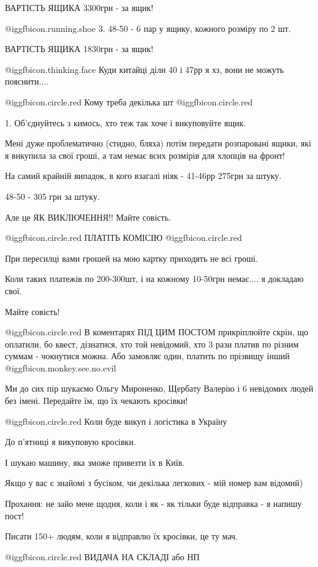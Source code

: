 ВАРТІСТЬ ЯЩИКА 3300грн - за ящик!

 @igg{fbicon.running.shoe}  3. 48-50 - 6 пар у ящику, кожного розміру по 2 шт.

ВАРТІСТЬ ЯЩИКА 1830грн - за ящик!

 @igg{fbicon.thinking.face} Куди китайці діли 40 і 47рр я хз, вони не можуть пояснити....

 @igg{fbicon.circle.red} Кому треба декілька шт @igg{fbicon.circle.red} 

1. Об'єднуйтесь з кимось, хто теж так хоче і викуповуйте ящик.

Мені дуже проблематично (стидно, бляха)  потім передати  розпаровані ящики, які
я викупила за свої гроші, а там немає всих розмірів для хлопців на фронт!

На самий крайній випадок, в кого взагалі ніяк - 41-46рр 275грн за штуку.

48-50 - 305 грн за штуку.

Але це ЯК ВИКЛЮЧЕННЯ!! Майте совість.

 @igg{fbicon.circle.red}  ПЛАТІТЬ КОМІСІЮ  @igg{fbicon.circle.red} 

При пересилці вами грошей на мою картку приходять не всі гроші.

Коли таких платежів по 200-300шт, і на кожному 10-50грн немає.... я докладаю
свої.

Майте совість!

 @igg{fbicon.circle.red}  В коментарях ПІД ЦИМ ПОСТОМ прикріплюйте скрін, що оплатили, бо квест,
дізнатися, хто той невідомий, хто 3 рази платив по різним суммам - чокнутися
можна. Або замовляє один, платить по прізвищу інший @igg{fbicon.monkey.see.no.evil} 

Ми до сих пір шукаємо Ольгу Мироненко, Щербату Валерію і 6 невідомих людей без
імені. Передайте їм, що їх чекають кросівки!

@igg{fbicon.circle.red}  Коли буде викуп і логістика в Україну

До п'ятниці я викуповую кросівки.

І шукаю машину, яка зможе привезти їх в Київ.

Якщо у вас є знайомі з бусіком, чи декілька легкових  - мій номер вам відомий)

Прохання: не зайо мене щодня, коли і як - як тільки буде відправка - я напишу
пост!

Писати 150+ людям, коли я відправлю їх кросівки, це ту мач.

@igg{fbicon.circle.red} ВИДАЧА НА СКЛАДІ або НП

